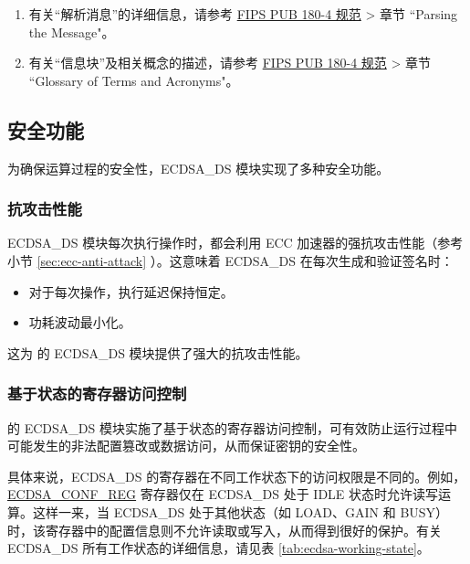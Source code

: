 \documentclass[main\_\_CN.tex]{subfiles}
\begin{document}
\begin{tiplisting}
\begin{enumerate}
\vspace{-2.5em}
    \item 有关“解析消息”的详细信息，请参考 \href{https://doi.org/10.6028/NIST.FIPS.180-4}{FIPS PUB 180-4 规范} > 章节 ``Parsing the Message"。
    \item 有关“信息块”及相关概念的描述，请参考 \href{https://doi.org/10.6028/NIST.FIPS.180-4}{FIPS PUB 180-4 规范} > 章节 ``Glossary of Terms and Acronyms"。
\end{enumerate}
\end{tiplisting}



\subsection{安全功能}
\label{sec:ecdsa-security_features}
为确保运算过程的安全性，ECDSA\_DS 模块实现了多种安全功能。

\subsubsection{抗攻击性能}

\chipseries{} ECDSA\_DS 模块每次执行操作时，都会利用 ECC 加速器的强抗攻击性能（参考小节 \ref{sec:ecc-anti-attack} \textit{}）。这意味着 ECDSA\_DS 在每次生成和验证签名时：

\begin{itemize}
    \item 对于每次操作，执行延迟保持恒定。
    \item 功耗波动最小化。
\end{itemize}

这为 \chipseries{} 的 ECDSA\_DS 模块提供了强大的抗攻击性能。

\subsubsection{基于状态的寄存器访问控制}

\chipseries{} 的 ECDSA\_DS 模块实施了基于状态的寄存器访问控制，可有效防止运行过程中可能发生的非法配置篡改或数据访问，从而保证密钥的安全性。

具体来说，ECDSA\_DS 的寄存器在不同工作状态下的访问权限是不同的。例如，\hyperref[regdesc:ECDSACONFREG]{ECDSA\_CONF\_REG} 寄存器仅在 ECDSA\_DS 处于 IDLE 状态时允许读写运算。这样一来，当 ECDSA\_DS 处于其他状态（如 LOAD、GAIN 和 BUSY）时，该寄存器中的配置信息则不允许读取或写入，从而得到很好的保护。有关 ECDSA\_DS 所有工作状态的详细信息，请见表 \ref{tab:ecdsa-working-state}。
\end{document}
